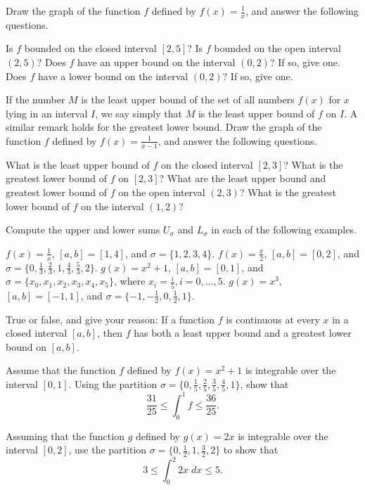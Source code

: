 \begin{exercises}

Draw the graph of the function $f$ defined by
$f(x) = \frac1x$,
and answer the following questions.
\begin{exenum}
\x
Is $f$ bounded on the closed interval $[2,5]$?
\x
Is $f$ bounded on the open interval $(2,5)$?
\x
Does $f$ have an upper bound on the interval $(0,2)$?
If so, give one.
\x
Does $f$ have a lower bound on the interval $(0,2)$?
If so, give one.
\end{exenum}

If the number $M$ is the least upper bound of the set
of all numbers $f(x)$ for $x$ lying in an interval $I$,
we say simply that $M$ is the least upper bound
of $f$ on $I$.
A similar remark holds for the greatest lower bound.
Draw the graph of the function $f$ defined by
$f(x) = \frac1{x-1}$, and answer the following questions.
\begin{exenum}
\x
What is the least upper bound of $f$ on the closed interval
$[2,3]$?
\x
What is the greatest lower bound of $f$ on $[2,3]$?
\x
What are the least upper bound and greatest lower bound
of $f$ on the open interval $(2,3)$?
\x
What is the greatest lower bound of $f$ on the interval
$(1,2)$?
\end{exenum}

Compute the upper and lower sums $U_\sigma$ and $L_\sigma$
in each of the following examples.
\begin{exenum}
\x
$f(x) = \frac1x$, $[a,b] = [1,4]$, and
$\sigma = \{1,2,3,4\}$.
\x
$f(x) = \frac x2$, $[a,b] = [0,2]$, and
$\sigma = \{0, \frac13, \frac23, 1, \frac43, \frac53, 2\}$.
\x
$g(x) = x^2 + 1$, $[a,b] = [0,1]$, and
$\sigma = \{x_0,x_1,x_2,x_3,x_4,x_5\}$,
where $x_i = \frac i5, i = 0, \ldots, 5$.
\x
$g(x) = x^3$, $[a,b] = [-1,1]$, and
$\sigma = \{-1, -\frac12, 0, \frac12, 1\}$.
\end{exenum}

True or false, and give your reason:
If a function $f$ is continuous at every $x$ in a
closed interval $[a,b]$, then $f$ has both a least upper
bound and a greatest lower bound on $[a,b]$.

Assume that the function $f$ defined by
$f(x) = x^2 + 1$ is integrable over the interval $[0,1]$.
Using the partition
$\sigma = \{0, \frac15, \frac25, \frac35, \frac45, 1\}$,
show that
\[
\frac{31}{25} \leq \int_0^1 f \leq \frac{36}{25}
.
\]

Assuming that the function $g$ defined by $g(x) = 2x$
is integrable over the interval $[0,2]$, use the partition
$\sigma = \{0, \frac12, 1, \frac32, 2\}$ to show that
\[
3 \leq \int_0^2 2x\;dx \leq 5
.
\]


\end{exercises}
